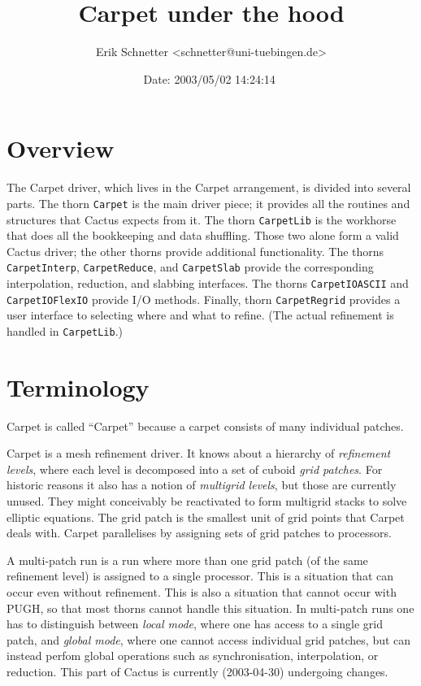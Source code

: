 \documentclass{article}
\begin{document}
\title{Carpet under the hood}
\author{Erik Schnetter \textless schnetter@uni-tuebingen.de\textgreater}
\date{$ $Date: 2003/05/02 14:24:14 $ $}
\maketitle

\tableofcontents

\section{Overview}

   The Carpet driver, which lives in the Carpet arrangement, is
   divided into several parts.  The thorn \texttt{Carpet} is the main
   driver piece; it provides all the routines and structures that
   Cactus expects from it.  The thorn \texttt{CarpetLib} is the
   workhorse that does all the bookkeeping and data shuffling.  Those
   two alone form a valid Cactus driver; the other thorns provide
   additional functionality.  The thorns \texttt{CarpetInterp},
   \texttt{CarpetReduce}, and \texttt{CarpetSlab} provide the
   corresponding interpolation, reduction, and slabbing interfaces.
   The thorns \texttt{CarpetIOASCII} and \texttt{CarpetIOFlexIO}
   provide I/O methods.  Finally, thorn \texttt{CarpetRegrid} provides
   a user interface to selecting where and what to refine.  (The
   actual refinement is handled in \texttt{CarpetLib}.)



\section{Terminology}

   Carpet is called ``Carpet'' because a carpet consists of many
   individual patches.

   Carpet is a mesh refinement driver.  It knows about a hierarchy of
   \emph{refinement levels}, where each level is decomposed into a set
   of cuboid \emph{grid patches}.  For historic reasons it also has a
   notion of \emph{multigrid levels}, but those are currently unused.
   They might conceivably be reactivated to form multigrid stacks to
   solve elliptic equations.  The grid patch is the smallest unit of
   grid points that Carpet deals with.  Carpet parallelises by
   assigning sets of grid patches to processors.

   A multi-patch run is a run where more than one grid patch (of the
   same refinement level) is assigned to a single processor.  This is
   a situation that can occur even without refinement.  This is also a
   situation that cannot occur with PUGH, so that most thorns cannot
   handle this situation.  In multi-patch runs one has to distinguish
   between \emph{local mode}, where one has access to a single grid
   patch, and \emph{global mode}, where one cannot access individual
   grid patches, but can instead perfom global operations such as
   synchronisation, interpolation, or reduction.  This part of Cactus
   is currently (2003-04-30) undergoing changes.
\end{document}
